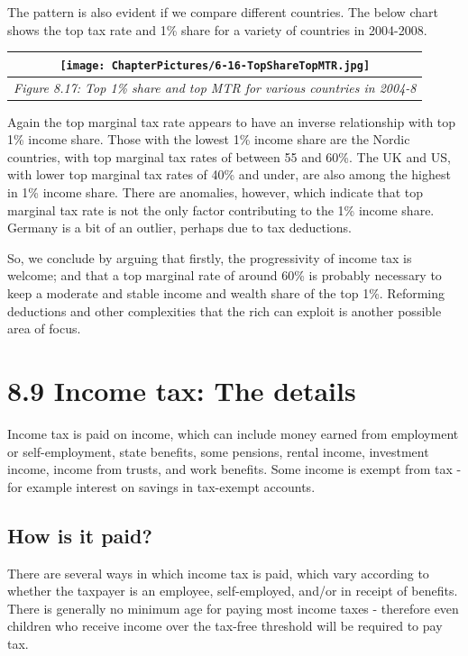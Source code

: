 \documentclass[]{tufte-handout}
\begin{document}
The pattern is also evident if we compare different countries. The below
chart shows the top tax rate and 1\% share for a variety of countries in
2004-2008.

\begin{longtable}[]{@{}c@{}}
\toprule
\texttt{[image: ChapterPictures/6-16-TopShareTopMTR.jpg]}\tabularnewline
\midrule
\endhead
\emph{Figure 8.17: Top 1\% share and top MTR for various countries in
2004-8}\tabularnewline
\bottomrule
\end{longtable}

Again the top marginal tax rate appears to have an inverse relationship
with top 1\% income share. Those with the lowest 1\% income share are
the Nordic countries, with top marginal tax rates of between 55 and
60\%. The UK and US, with lower top marginal tax rates of 40\% and
under, are also among the highest in 1\% income share. There are
anomalies, however, which indicate that top marginal tax rate is not the
only factor contributing to the 1\% income share. Germany is a bit of an
outlier, perhaps due to tax deductions.

So, we conclude by arguing that firstly, the progressivity of income tax
is welcome; and that a top marginal rate of around 60\% is probably
necessary to keep a moderate and stable income and wealth share of the
top 1\%. Reforming deductions and other complexities that the rich can
exploit is another possible area of focus.

\hypertarget{income-tax-the-details}{%
\section{8.9 Income tax: The details}\label{income-tax-the-details}}

Income tax is paid on income, which can include money earned from
employment or self-employment, state benefits, some pensions, rental
income, investment income, income from trusts, and work benefits. Some
income is exempt from tax - for example interest on savings in
tax-exempt accounts.

\hypertarget{how-is-it-paid}{%
\subsection{How is it paid?}\label{how-is-it-paid}}

There are several ways in which income tax is paid, which vary according
to whether the taxpayer is an employee, self-employed, and/or in receipt
of benefits. There is generally no minimum age for paying most income
taxes - therefore even children who receive income over the tax-free
threshold will be required to pay tax.
\end{document}
